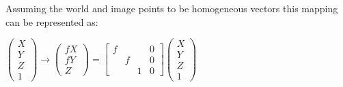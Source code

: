     Assuming the world and image points to be homogeneous vectors this mapping can be represented as:
   \begin{center}
$\left(\begin{array}{c}X \\ Y \\ Z \\ 1 \end{array}\right) \rightarrow \left(\begin{array}{c} fX \\ fY \\ Z \end{array}\right) = \begin{bmatrix}f & & & 0 \\  &f & & 0  \\   & &1 & 0   \end{bmatrix}\left(\begin{array}{c}X\\ Y  \\Z \\ 1 \end{array}\right)$

\end{center}
    

